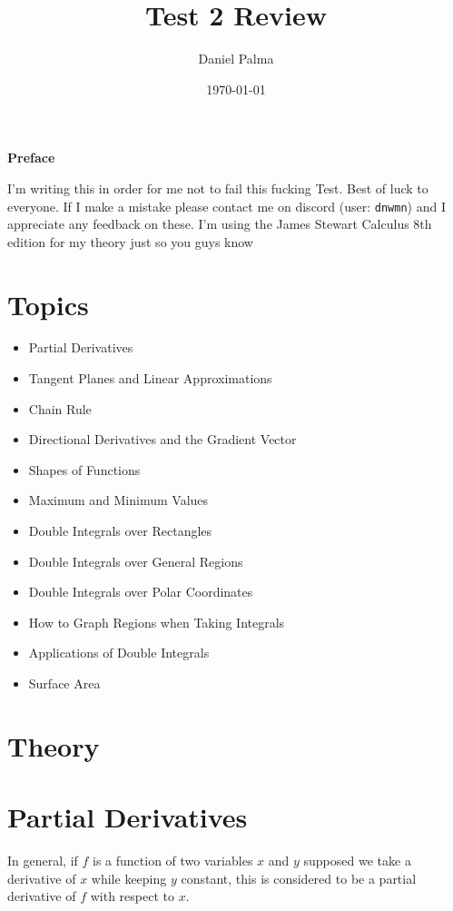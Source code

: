 \documentclass{article}
\author{Daniel Palma}
\date{\today}
\title{Test 2 Review}
\newcommand{\prefacename}{Preface}
\newenvironment{preface}{
    \vspace*{\stretch{2}}
    {\noindent \bfseries \Huge \prefacename}
    \begin{center}
        \thispagestyle{plain}
    \end{center}%
}
{\vspace*{\stretch{5}}}
\begin{document}
\maketitle
\newpage

\begin{preface}
    I'm writing this in order for me not to fail this fucking Test.
    Best of luck to everyone. If I make a mistake please contact me on discord (user: \verb|dnwmn|) and I appreciate any feedback on these. I'm using the James Stewart Calculus 8th edition for my theory just so you guys know 
\end{preface}

\tableofcontents
\newpage



\section*{Topics}

\begin{itemize}
    \item Partial Derivatives
    \item Tangent Planes and Linear Approximations
    \item Chain Rule
    \item Directional Derivatives and the Gradient Vector
    \item Shapes of Functions
    \item Maximum and Minimum Values
    \item Double Integrals over Rectangles
    \item Double Integrals over General Regions
    \item Double Integrals over Polar Coordinates 
    \item How to Graph Regions when Taking Integrals
    \item Applications of Double Integrals 
    \item Surface Area 
\end{itemize}


\newpage
\section*{Theory}

\section{Partial Derivatives}

In general, if $f$ is a function of two variables $x$ and $y$ supposed we take a derivative of $x$ while keeping $y$ constant, this is considered to be a partial derivative of $f$ with respect to $x$.
\end{document}
